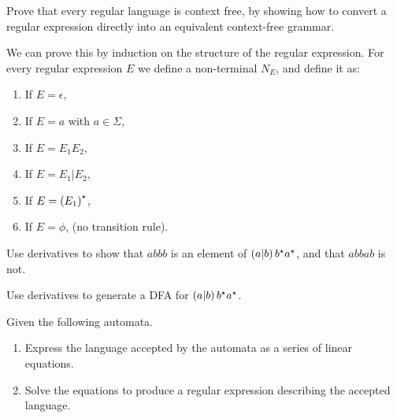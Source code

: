 \documentclass{article}
\begin{document}
\begin{exercise}
Prove that every regular language is context free, by showing how to convert a regular expression directly into an equivalent context-free grammar.
\begin{answer}
We can prove this by induction on the structure of the regular expression. For every regular expression $E$ we define a non-terminal $N_E$, and define it as:
\begin{enumerate}
 \item If $E=\epsilon$, 
 \item If $E=a$ with $a\in\Sigma$, 
 \item If $E=E_1E_2$, 
 \item If $E=E_1|E_2$, 
 \item If $E=\left( E_1 \right)^{\star}$, 
 \item If $E=\phi$,  (no transition rule).
\end{enumerate}
\end{answer}
\end{exercise}

\begin{exercise}
Use derivatives to show that $abbb$ is an element of $\left( a|b \right)b^{\star}a^{\star}$, and that $abbab$ is not.
\begin{answer}

\end{answer}
\end{exercise}

\begin{exercise}
Use derivatives to generate a DFA for $\left( a|b \right)b^{\star}a^{\star}$.
\begin{answer}

\end{answer}
\end{exercise}

\begin{exercise}
Given the following automata.


\begin{enumerate}
 \item Express the language accepted by the automata as a series of linear equations.
 \item Solve the equations to produce a regular expression describing the accepted language.
\end{enumerate}
\begin{answer}

\end{answer}
\end{exercise}
\end{document}
